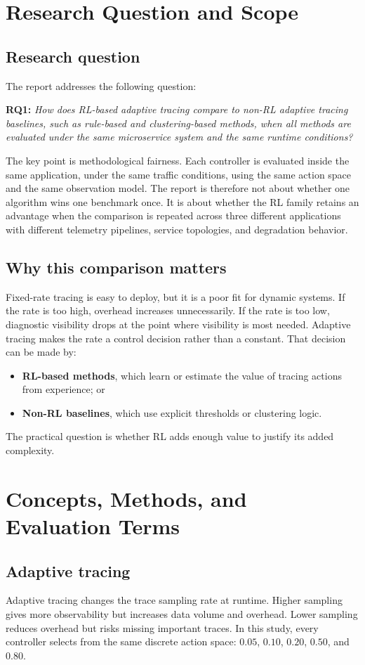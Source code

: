 \documentclass[11pt]{report}
\begin{document}
\chapter{Research Question and Scope}
\section{Research question}
The report addresses the following question:

\textbf{RQ1:} \emph{How does RL-based adaptive tracing compare to non-RL adaptive tracing baselines, such as rule-based and clustering-based methods, when all methods are evaluated under the same microservice system and the same runtime conditions?}

The key point is methodological fairness. Each controller is evaluated inside the same application, under the same traffic conditions, using the same action space and the same observation model. The report is therefore not about whether one algorithm wins one benchmark once. It is about whether the RL family retains an advantage when the comparison is repeated across three different applications with different telemetry pipelines, service topologies, and degradation behavior.

\section{Why this comparison matters}
Fixed-rate tracing is easy to deploy, but it is a poor fit for dynamic systems. If the rate is too high, overhead increases unnecessarily. If the rate is too low, diagnostic visibility drops at the point where visibility is most needed. Adaptive tracing makes the rate a control decision rather than a constant. That decision can be made by:
\begin{itemize}
    \item \textbf{RL-based methods}, which learn or estimate the value of tracing actions from experience; or
    \item \textbf{Non-RL baselines}, which use explicit thresholds or clustering logic.
\end{itemize}
The practical question is whether RL adds enough value to justify its added complexity.

\chapter{Concepts, Methods, and Evaluation Terms}
\section{Adaptive tracing}
Adaptive tracing changes the trace sampling rate at runtime. Higher sampling gives more observability but increases data volume and overhead. Lower sampling reduces overhead but risks missing important traces. In this study, every controller selects from the same discrete action space: $0.05$, $0.10$, $0.20$, $0.50$, and $0.80$.
\end{document}
